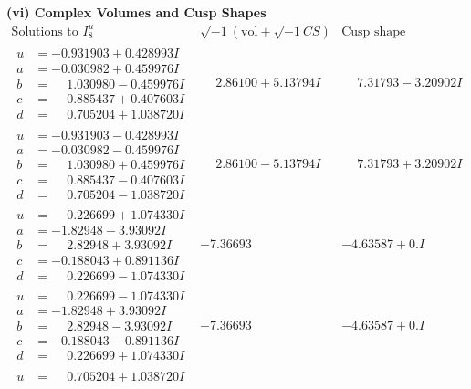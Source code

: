 \documentclass[1p]{elsarticle_modified}
\theoremstyle{definition}
\newcommand{\I}{\sqrt{-1}}
\begin{document}
\newpage\flushleft \textbf{(vi) Complex Volumes and Cusp Shapes}
$$\begin{array}{c|c|c}  
\text{Solutions to }I^u_{8}& \I (\text{vol} + \sqrt{-1}CS) & \text{Cusp shape}\\
 \hline 
\begin{aligned}
u &= -0.931903 + 0.428993 I \\
a &= -0.030982 + 0.459976 I \\
b &= \phantom{-}1.030980 - 0.459976 I \\
c &= \phantom{-}0.885437 + 0.407603 I \\
d &= \phantom{-}0.705204 + 1.038720 I\end{aligned}
 & \phantom{-}2.86100 + 5.13794 I & \phantom{-}7.31793 - 3.20902 I \\ \hline\begin{aligned}
u &= -0.931903 - 0.428993 I \\
a &= -0.030982 - 0.459976 I \\
b &= \phantom{-}1.030980 + 0.459976 I \\
c &= \phantom{-}0.885437 - 0.407603 I \\
d &= \phantom{-}0.705204 - 1.038720 I\end{aligned}
 & \phantom{-}2.86100 - 5.13794 I & \phantom{-}7.31793 + 3.20902 I \\ \hline\begin{aligned}
u &= \phantom{-}0.226699 + 1.074330 I \\
a &= -1.82948 - 3.93092 I \\
b &= \phantom{-}2.82948 + 3.93092 I \\
c &= -0.188043 + 0.891136 I \\
d &= \phantom{-}0.226699 - 1.074330 I\end{aligned}
 & -7.36693\phantom{ +0.000000I} & -4.63587 + 0. I\phantom{ +0.000000I} \\ \hline\begin{aligned}
u &= \phantom{-}0.226699 - 1.074330 I \\
a &= -1.82948 + 3.93092 I \\
b &= \phantom{-}2.82948 - 3.93092 I \\
c &= -0.188043 - 0.891136 I \\
d &= \phantom{-}0.226699 + 1.074330 I\end{aligned}
 & -7.36693\phantom{ +0.000000I} & -4.63587 + 0. I\phantom{ +0.000000I} \\ \hline\begin{aligned}
u &= \phantom{-}0.705204 + 1.038720 I \\

\end{aligned}
\end{array}$$
\end{document}
